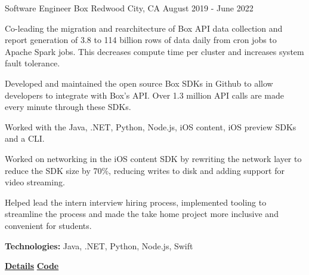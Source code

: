 
\begin{cventries}
  \cventry
    {Software Engineer} %
    {Box} %
    {Redwood City, CA} %
    {August 2019 - June 2022} %
    {
      \begin{cvitems} %
        \item{Co-leading the migration and rearchitecture of Box API data collection and report generation of 3.8 to 114 billion rows of data daily from cron jobs to Apache Spark jobs. This decreases compute time per cluster and increases system fault tolerance.}
        \item{Developed and maintained the open source Box SDKs in Github to allow developers to integrate with Box's API. Over 1.3 million API calls are made every minute through these SDKs.}
        \item{Worked with the Java, .NET, Python, Node.js, iOS content, iOS preview SDKs and a CLI.}
        \item{Worked on networking in the iOS content SDK by rewriting the network layer to reduce the SDK size by 70\%, reducing writes to disk and adding support for video streaming.}
        \item{Helped lead the intern interview hiring process, implemented tooling to streamline the process and made the take home project more inclusive and convenient for students.}
        {\setlength \itemindent{-2ex} \itemsep2pt \item[] \textbf{Technologies:} Java, .NET, Python, Node.js, Swift}
        {\setlength \itemindent{-2ex} \itemsep2pt \item[] 
        \href{https://sujaygarlanka.com/experience.html\#box}{ \faInfoCircle \textbf{{ Details}}}
        \href{https://github.com/box/sdks}{ \faGithub \textbf{{ Code}}}}
      \end{cvitems}
    }
    

\end{cventries}
